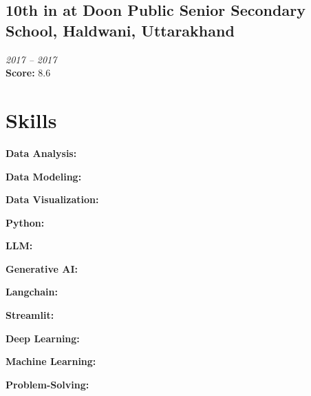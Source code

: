 \documentclass{article}
\begin{document}
\subsection{10th in  at Doon Public Senior Secondary School, Haldwani, Uttarakhand}
\textit{2017 -- 2017}\\
\textbf{Score:} 8.6\\

\section{Skills}
\textbf{Data Analysis:} \begin{itemize}[label=$\bullet$]
\end{itemize}

\textbf{Data Modeling:} \begin{itemize}[label=$\bullet$]
\end{itemize}

\textbf{Data Visualization:} \begin{itemize}[label=$\bullet$]
\end{itemize}

\textbf{Python:} \begin{itemize}[label=$\bullet$]
\end{itemize}

\textbf{LLM:} \begin{itemize}[label=$\bullet$]
\end{itemize}

\textbf{Generative AI:} \begin{itemize}[label=$\bullet$]
\end{itemize}

\textbf{Langchain:} \begin{itemize}[label=$\bullet$]
\end{itemize}

\textbf{Streamlit:} \begin{itemize}[label=$\bullet$]
\end{itemize}

\textbf{Deep Learning:} \begin{itemize}[label=$\bullet$]
\end{itemize}

\textbf{Machine Learning:} \begin{itemize}[label=$\bullet$]
\end{itemize}

\textbf{Problem-Solving:} \begin{itemize}[label=$\bullet$]
\end{itemize}
\end{document}
